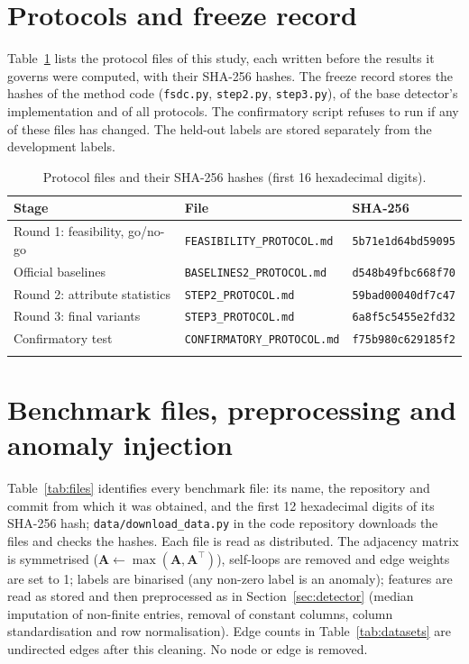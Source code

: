\documentclass[pdflatex,sn-mathphys-ay]{sn-jnl}
\theoremstyle{plain}
\theoremstyle{remark}
\begin{document}
\begin{appendices}
\section{Protocols and freeze record}\label{app:prereg}

Table~\ref{tab:hashes} lists the protocol files of this study, each written before the results it governs were computed, with their SHA-256 hashes. The freeze record stores the hashes of the method code (\texttt{fsdc.py}, \texttt{step2.py}, \texttt{step3.py}), of the base detector's implementation and of all protocols. The confirmatory script refuses to run if any of these files has changed. The held-out labels are stored separately from the development labels.

\begin{table}[h]
\caption{Protocol files and their SHA-256 hashes (first 16 hexadecimal digits).}
\label{tab:hashes}
\footnotesize
\begin{tabular}{@{}lll@{}}
\toprule
Stage & File & SHA-256 \\
\midrule
Round 1: feasibility, go/no-go & \texttt{FEASIBILITY\_PROTOCOL.md} & \texttt{5b71e1d64bd59095} \\
Official baselines & \texttt{BASELINES2\_PROTOCOL.md} & \texttt{d548b49fbc668f70} \\
Round 2: attribute statistics & \texttt{STEP2\_PROTOCOL.md} & \texttt{59bad00040df7c47} \\
Round 3: final variants & \texttt{STEP3\_PROTOCOL.md} & \texttt{6a8f5c5455e2fd32} \\
Confirmatory test & \texttt{CONFIRMATORY\_PROTOCOL.md} & \texttt{f75b980c629185f2} \\
\botrule
\end{tabular}
\end{table}

\section{Benchmark files, preprocessing and anomaly injection}\label{app:data}
\setcounter{table}{0}

Table~\ref{tab:files} identifies every benchmark file: its name, the repository and commit from which it was obtained, and the first 12 hexadecimal digits of its SHA-256 hash; \texttt{data/download\_data.py} in the code repository downloads the files and checks the hashes. Each file is read as distributed. The adjacency matrix is symmetrised ($\mathbf{A}\leftarrow\max(\mathbf{A},\mathbf{A}^{\top})$), self-loops are removed and edge weights are set to 1; labels are binarised (any non-zero label is an anomaly); features are read as stored and then preprocessed as in Section~\ref{sec:detector} (median imputation of non-finite entries, removal of constant columns, column standardisation and row normalisation). Edge counts in Table~\ref{tab:datasets} are undirected edges after this cleaning. No node or edge is removed.


\end{appendices}
\end{document}
